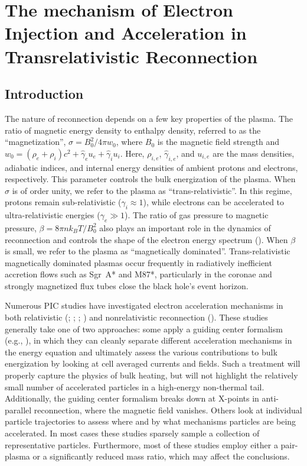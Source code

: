 \chapter[The mechanism of Electron Injection and Acceleration in Transrelativistic Reconnection]
{The mechanism of Electron Injection and Acceleration in Transrelativistic Reconnection}

\section{Introduction} \label{introduction}
The nature of reconnection depends on a few key properties of the plasma.  The ratio of magnetic energy density to enthalpy density, referred to as the ``magnetization'',
$\sigma=B_{0}^2 / 4\pi w_{0} $, where $B_{0}$ is the magnetic field strength and $w_0=(\rho_{e}+\rho_{i})c^{2}+ \hat{\gamma}_{e}u_{e}+ \hat{\gamma}_{i}u_{i}$.  Here, $\rho_{i,e}$, $\hat{\gamma}_{i,e}$, and $u_{i,e}$ are the mass densities, adiabatic indices, and internal energy densities of ambient protons and electrons, respectively.  This parameter
controls the bulk energization of the plasma.  When $\sigma$ is of order unity, we refer to the plasma as ``trans-relativistic''.  In this regime, protons remain sub-relativistic ($\gamma_{i} \approx 1$), while electrons can be accelerated to ultra-relativistic energies ($\gamma_{e} \gg 1$). 
The ratio of gas pressure to magnetic pressure, $\beta=8\pi nk_{B}T/B_{0}^{2}$ also plays an important role in the dynamics of reconnection and controls the shape of the electron energy spectrum (\citealt{ball2018}).  When $\beta$ is small, we refer to the plasma as ``magnetically dominated''.  Trans-relativistic magnetically dominated plasmas occur frequently in radiatively inefficient accretion flows such as Sgr~A* and M87*, particularly in the coronae and strongly magnetized flux tubes close the black hole's event horizon.   

Numerous PIC studies have investigated electron acceleration mechanisms in both relativistic (\citealt{sironi2014}; \citealt{nalewajko2015}; \citealt{guo2015, guo2019}; \citealt{werner2017}) and nonrelativistic reconnection (\citealt{dahlin2014,wangh2016, li_guo_2017}).  These studies generally take one of two approaches: some apply a guiding center formalism (e.g., \citealt{dahlin2014}), in which they can cleanly separate different acceleration mechanisms in the energy equation and ultimately assess the various contributions to bulk energization by looking at cell averaged currents and fields. Such a treatment will properly capture the physics of bulk heating, but will not highlight the relatively small number of accelerated particles in a high-energy non-thermal tail.  Additionally, the guiding center formalism breaks down at X-points in anti-parallel reconnection, where the magnetic field vanishes.  Others look at individual particle trajectories to assess where and by what mechanisms particles are being accelerated.  In most cases these studies sparsely sample a collection of representative particles.  Furthermore, most of these studies employ either a pair-plasma or a significantly reduced mass ratio, which may affect the conclusions. 

